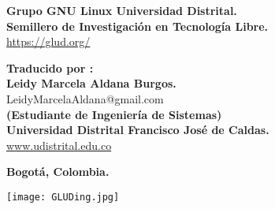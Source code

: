 \begin{center}

\textbf{ Grupo GNU Linux Universidad Distrital. \\
Semillero de Investigación en Tecnología Libre.} \\
\url{https://glud.org/}

\vspace{1.0cm}

\textbf{Traducido por : \\
Leidy Marcela Aldana Burgos. \\}
LeidyMarcelaAldana@gmail.com \\
\textbf{(Estudiante de Ingeniería de Sistemas) \\
Universidad Distrital Francisco José de Caldas.} \\
\url{www.udistrital.edu.co}  \\

\vspace{1.0cm}

\textbf{Bogotá, Colombia.}

\vspace{2.5cm}

\texttt{[image: GLUDing.jpg]}

\end{center}

\newpage
